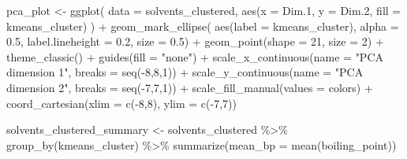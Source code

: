 \documentclass[
]{krantz}
\newenvironment{Shaded}{\begin{snugshade}}{\end{snugshade}}
\newcommand{\AttributeTok}[1]{\textcolor[rgb]{0.77,0.63,0.00}{#1}}
\newcommand{\DecValTok}[1]{\textcolor[rgb]{0.00,0.00,0.81}{#1}}
\newcommand{\FloatTok}[1]{\textcolor[rgb]{0.00,0.00,0.81}{#1}}
\newcommand{\FunctionTok}[1]{\textcolor[rgb]{0.00,0.00,0.00}{#1}}
\newcommand{\NormalTok}[1]{#1}
\newcommand{\OtherTok}[1]{\textcolor[rgb]{0.56,0.35,0.01}{#1}}
\newcommand{\SpecialCharTok}[1]{\textcolor[rgb]{0.00,0.00,0.00}{#1}}
\newcommand{\StringTok}[1]{\textcolor[rgb]{0.31,0.60,0.02}{#1}}
\begin{document}
\begin{Shaded}
\begin{Highlighting}[]
\NormalTok{pca\_plot }\OtherTok{\textless{}{-}} \FunctionTok{ggplot}\NormalTok{( }\AttributeTok{data =}\NormalTok{ solvents\_clustered, }\FunctionTok{aes}\NormalTok{(}\AttributeTok{x =}\NormalTok{ Dim}\FloatTok{.1}\NormalTok{, }\AttributeTok{y =}\NormalTok{ Dim}\FloatTok{.2}\NormalTok{, }\AttributeTok{fill =}\NormalTok{ kmeans\_cluster) ) }\SpecialCharTok{+}
  \FunctionTok{geom\_mark\_ellipse}\NormalTok{(}
    \FunctionTok{aes}\NormalTok{(}\AttributeTok{label =}\NormalTok{ kmeans\_cluster), }
    \AttributeTok{alpha =} \FloatTok{0.5}\NormalTok{, }\AttributeTok{label.lineheight =} \FloatTok{0.2}\NormalTok{, }\AttributeTok{size =} \FloatTok{0.5}\NormalTok{) }\SpecialCharTok{+}
  \FunctionTok{geom\_point}\NormalTok{(}\AttributeTok{shape =} \DecValTok{21}\NormalTok{, }\AttributeTok{size =} \DecValTok{2}\NormalTok{) }\SpecialCharTok{+}
  \FunctionTok{theme\_classic}\NormalTok{() }\SpecialCharTok{+}
  \FunctionTok{guides}\NormalTok{(}\AttributeTok{fill =} \StringTok{"none"}\NormalTok{) }\SpecialCharTok{+}
  \FunctionTok{scale\_x\_continuous}\NormalTok{(}\AttributeTok{name =} \StringTok{"PCA dimension 1"}\NormalTok{, }\AttributeTok{breaks =} \FunctionTok{seq}\NormalTok{(}\SpecialCharTok{{-}}\DecValTok{8}\NormalTok{,}\DecValTok{8}\NormalTok{,}\DecValTok{1}\NormalTok{)) }\SpecialCharTok{+}
  \FunctionTok{scale\_y\_continuous}\NormalTok{(}\AttributeTok{name =} \StringTok{"PCA dimension 2"}\NormalTok{, }\AttributeTok{breaks =} \FunctionTok{seq}\NormalTok{(}\SpecialCharTok{{-}}\DecValTok{7}\NormalTok{,}\DecValTok{7}\NormalTok{,}\DecValTok{1}\NormalTok{)) }\SpecialCharTok{+}
  \FunctionTok{scale\_fill\_manual}\NormalTok{(}\AttributeTok{values =}\NormalTok{ colors) }\SpecialCharTok{+}
  \FunctionTok{coord\_cartesian}\NormalTok{(}\AttributeTok{xlim =} \FunctionTok{c}\NormalTok{(}\SpecialCharTok{{-}}\DecValTok{8}\NormalTok{,}\DecValTok{8}\NormalTok{), }\AttributeTok{ylim =} \FunctionTok{c}\NormalTok{(}\SpecialCharTok{{-}}\DecValTok{7}\NormalTok{,}\DecValTok{7}\NormalTok{))}

\NormalTok{solvents\_clustered\_summary }\OtherTok{\textless{}{-}}\NormalTok{ solvents\_clustered }\SpecialCharTok{\%\textgreater{}\%}
  \FunctionTok{group\_by}\NormalTok{(kmeans\_cluster) }\SpecialCharTok{\%\textgreater{}\%}
  \FunctionTok{summarize}\NormalTok{(}\AttributeTok{mean\_bp =} \FunctionTok{mean}\NormalTok{(boiling\_point))}


\end{Highlighting}
\end{Shaded}
\end{document}
